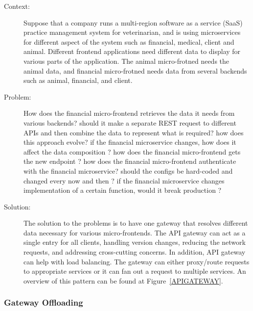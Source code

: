 \documentclass{bmcart}
\begin{document}
\begin{description}
  \item[Context:] Suppose that a company runs a multi-region software as a service (SaaS) practice management system for veterinarian, and is using microservices for different aspect of the system such as financial, medical, client and animal. Different frontend applications need different data to display for various parts of the application. The animal micro-frotned needs the animal data, and financial micro-frotned needs data from several backends such as animal, financial, and client. 
  \item[Problem:] How does the financial micro-frontend retrieves the data it needs from various backends? should it make a separate REST request to different APIs and then combine the data to represent what is required? how does this approach evolve? if the financial microservice changes, how does it affect the data composition ? how does the financial micro-frontend gets the new endpoint ? how does the financial micro-frontend authenticate with the financial microservice? should the configs be hard-coded and changed every now and then ? if the financial microservice changes implementation of a certain function, would it break production ?
  \item[Solution:] The solution to the problems is to have one gateway that resolves different data necessary for various micro-frontends. The API gateway can act as a single entry for all clients, handling version changes, reducing the network requests, and addressing cross-cutting concerns. In addition, API gateway can help with load balancing. The gateway can either proxy/route requests to appropriate services or it can fan out a request to multiple services. An overview of this pattern can be found at Figure~\ref{APIGATEWAY}.
  

\end{description}


\subsubsection{Gateway Offloading}
\end{document}
